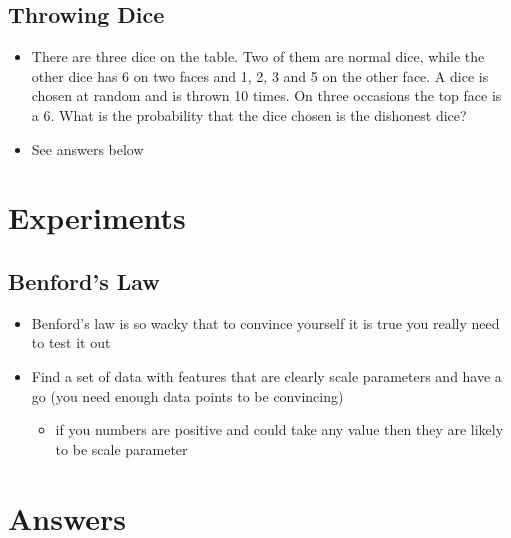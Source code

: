 \documentclass[11pt]{article}
\begin{document}
\subsection{Throwing Dice}
\label{sec:org994d206}
\begin{itemize}
\item There are three dice on the table.  Two of them are normal dice,
while the other dice has 6 on two faces and 1, 2, 3 and 5 on the other
face.  A dice is chosen at random and is thrown 10 times.  On three
occasions the top face is a 6.  What is the probability that the dice
chosen is the dishonest dice?
\item See answers below
\end{itemize}


\section{Experiments}
\label{sec:org64e845e}

\subsection{Benford's Law}
\label{sec:org2df9599}
\begin{itemize}
\item Benford's law is so wacky that to convince yourself it is true
you really need to test it out
\item Find a set of data with features that are clearly scale
parameters and have a go (you need enough data points to be
convincing)
\begin{itemize}
\item if you numbers are positive and could take any value then they
are likely to be scale parameter
\end{itemize}
\end{itemize}

\section{Answers}
\label{sec:org2b809dd}
\end{document}

